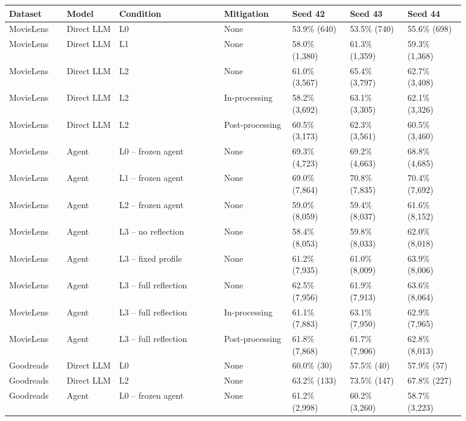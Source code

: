 \begin{table}[htbp!]
\centering
\small
\setlength{\tabcolsep}{3pt}
\renewcommand{\arraystretch}{1.1}
\begin{tabular}{p{0.11\linewidth}p{0.10\linewidth}p{0.20\linewidth}p{0.13\linewidth}p{0.115\linewidth}p{0.115\linewidth}p{0.115\linewidth}}
\hline
Dataset & Model & Condition & Mitigation & Seed 42 & Seed 43 & Seed 44 \\
\hline
MovieLens & Direct LLM & L0 & None & 53.9\% (640) & 53.5\% (740) & 55.6\% (698) \\
MovieLens & Direct LLM & L1 & None & 58.0\% (1,380) & 61.3\% (1,359) & 59.3\% (1,368) \\
MovieLens & Direct LLM & L2 & None & 61.0\% (3,567) & 65.4\% (3,797) & 62.7\% (3,408) \\
MovieLens & Direct LLM & L2 & In-processing & 58.2\% (3,692) & 63.1\% (3,305) & 62.1\% (3,326) \\
MovieLens & Direct LLM & L2 & Post-processing & 60.5\% (3,173) & 62.3\% (3,561) & 60.5\% (3,460) \\
MovieLens & Agent & L0 -- frozen agent & None & 69.3\% (4,723) & 69.2\% (4,663) & 68.8\% (4,685) \\
MovieLens & Agent & L1 -- frozen agent & None & 69.0\% (7,864) & 70.8\% (7,835) & 70.4\% (7,692) \\
MovieLens & Agent & L2 -- frozen agent & None & 59.0\% (8,059) & 59.4\% (8,037) & 61.6\% (8,152) \\
MovieLens & Agent & L3 -- no reflection & None & 58.4\% (8,053) & 59.8\% (8,033) & 62.0\% (8,018) \\
MovieLens & Agent & L3 -- fixed profile & None & 61.2\% (7,935) & 61.0\% (8,009) & 63.9\% (8,006) \\
MovieLens & Agent & L3 -- full reflection & None & 62.5\% (7,956) & 61.9\% (7,913) & 63.6\% (8,064) \\
MovieLens & Agent & L3 -- full reflection & In-processing & 61.1\% (7,883) & 63.1\% (7,950) & 62.9\% (7,965) \\
MovieLens & Agent & L3 -- full reflection & Post-processing & 61.8\% (7,868) & 61.7\% (7,906) & 62.8\% (8,013) \\
Goodreads & Direct LLM & L0 & None & 60.0\% (30) & 57.5\% (40) & 57.9\% (57) \\
Goodreads & Direct LLM & L2 & None & 63.2\% (133) & 73.5\% (147) & 67.8\% (227) \\
Goodreads & Agent & L0 -- frozen agent & None & 61.2\% (2,998) & 60.2\% (3,260) & 58.7\% (3,223) \\

\end{tabular}
\end{table}
